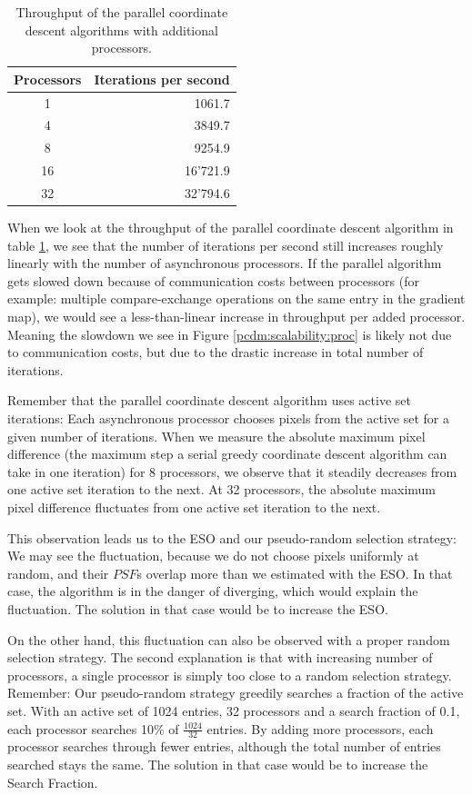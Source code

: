 \begin{table} [h]
	\centering
		\begin{tabular}{c | r }
			Processors & Iterations per second \\ \hline
			1 & 1061.7 \\
			4 & 3849.7 \\
			8 & 9254.9 \\
			16 & 16'721.9 \\
			32 & 32'794.6 \\
		\end{tabular}
	\caption{Throughput of the parallel coordinate descent algorithms with additional processors.}
	\label{pcdm:scalability:throughput}
\end{table}

When we look at the throughput of the parallel coordinate descent algorithm in table \ref{pcdm:scalability:throughput}, we see that the number of iterations per second still increases roughly linearly with the number of asynchronous processors. If the parallel algorithm gets slowed down because of communication costs between processors (for example: multiple compare-exchange operations on the same entry in the gradient map), we would see a less-than-linear increase in throughput per added processor. Meaning the slowdown we see in Figure \ref{pcdm:scalability:proc} is likely not due to communication costs, but due to the drastic increase in total number of iterations.

Remember that the parallel coordinate descent algorithm uses active set iterations: Each asynchronous processor chooses pixels from the active set for a given number of iterations. When we measure the absolute maximum pixel difference (the maximum step a serial greedy coordinate descent algorithm can take in one iteration) for 8 processors, we observe that it steadily decreases from one active set iteration to the next. At 32 processors, the absolute maximum pixel difference fluctuates from one active set iteration to the next.

This observation leads us to the ESO and our pseudo-random selection strategy: We may see the fluctuation, because we do not choose pixels uniformly at random, and their $PSF$s overlap more than we estimated with the ESO. In that case, the algorithm is in the danger of diverging, which would explain the fluctuation. The solution in that case would be to increase the ESO.

On the other hand, this fluctuation can also be observed with a proper random selection strategy. The second explanation is that with increasing number of processors, a single processor is simply too close to a random selection strategy. Remember: Our pseudo-random strategy greedily searches a fraction of the active set. With an active set of 1024 entries, 32 processors and a search fraction of 0.1, each processor searches 10\% of $\frac{1024}{32}$ entries. By adding more processors, each processor searches through fewer entries, although the total number of entries searched stays the same. The solution in that case would be to increase the Search Fraction.

